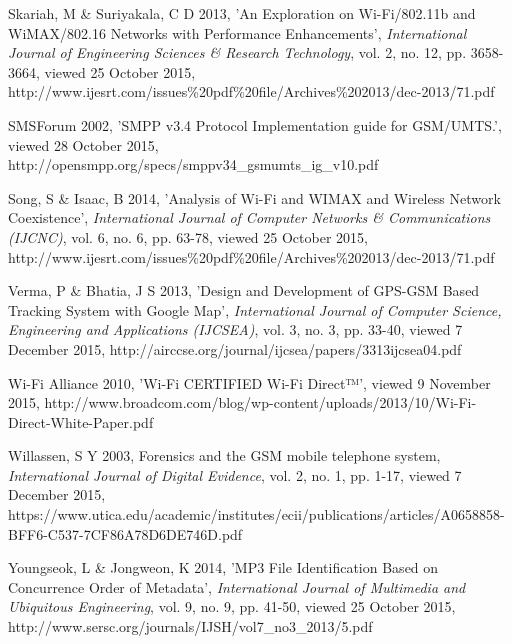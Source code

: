 \documentclass[12pt,svgnames,smaller]{article} %
\begin{document}
\begin{thebibliography}{ 10 }
		
		Skariah, M \& Suriyakala, C D 2013, 'An Exploration on Wi-Fi/802.11b and WiMAX/802.16 Networks with Performance Enhancements', \emph{International Journal of Engineering Sciences \& Research Technology}, vol. 2, no. 12, pp. 3658-3664, viewed 25 October 2015, http://www.ijesrt.com/issues\%20pdf\%20file/Archives\%202013/dec-2013/71.pdf
		
		
		SMSForum 2002, 'SMPP v3.4 Protocol Implementation guide for GSM/UMTS.', viewed 28 October 2015, http://opensmpp.org/specs/smppv34\_gsmumts\_ig\_v10.pdf
		
		
		Song, S \& Isaac, B 2014, 'Analysis of Wi-Fi and WIMAX and Wireless Network Coexistence', \emph{International Journal of Computer Networks \& Communications (IJCNC)}, vol. 6, no. 6, pp. 63-78, viewed 25 October 2015, http://www.ijesrt.com/issues\%20pdf\%20file/Archives\%202013/dec-2013/71.pdf
		
		
		Verma, P \& Bhatia, J S 2013, 'Design and Development of GPS-GSM Based Tracking System with Google Map', \emph{International Journal of Computer Science, Engineering and Applications (IJCSEA)}, vol. 3, no. 3, pp. 33-40, viewed 7 December 2015, http://airccse.org/journal/ijcsea/papers/3313ijcsea04.pdf
		
		
		Wi-Fi Alliance 2010, 'Wi-Fi CERTIFIED Wi-Fi Direct™', viewed 9 November 2015, http://www.broadcom.com/blog/wp-content/uploads/2013/10/Wi-Fi-Direct-White-Paper.pdf
		
		
		Willassen, S Y 2003, Forensics and the GSM mobile telephone system, \emph{International Journal of Digital Evidence}, vol. 2, no. 1, pp. 1-17, viewed 7 December 2015, https://www.utica.edu/academic/institutes/ecii/publications/articles/A0658858-BFF6-C537-7CF86A78D6DE746D.pdf
		
		
		Youngseok, L \& Jongweon, K 2014, 'MP3 File Identification Based on Concurrence Order of Metadata', \emph{International Journal of Multimedia and Ubiquitous Engineering}, vol. 9, no. 9, pp. 41-50, viewed 25 October 2015, http://www.sersc.org/journals/IJSH/vol7\_no3\_2013/5.pdf
		
	\end{thebibliography}
	
\end{document}
